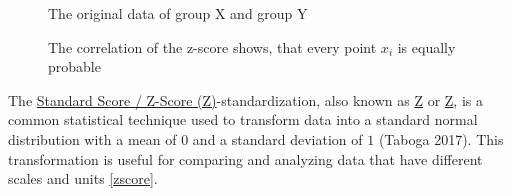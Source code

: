 \documentclass[
  a4paper,
]{scrbook}
\begin{document}
\begin{figure}[ht]


\caption{\label{fig-z-scores-raw}The original data of group X and group
Y}

\end{figure}%

\begin{figure}[ht]


\caption{\label{fig-z-scores-scaled}The correlation of the z-score
shows, that every point \(x_i\) is equally probable}

\end{figure}%

The \hyperref[acronyms_Z]{Standard Score / Z-Score (Z)}-standardization,
also known as \hyperref[acronyms_Z]{Z} or \hyperref[acronyms_Z]{Z}, is a
common statistical technique used to transform data into a standard
normal distribution with a mean of \(0\) and a standard deviation of
\(1\) (Taboga 2017). This transformation is useful for comparing and
analyzing data that have different scales and units \eqref{zscore}.
\end{document}
